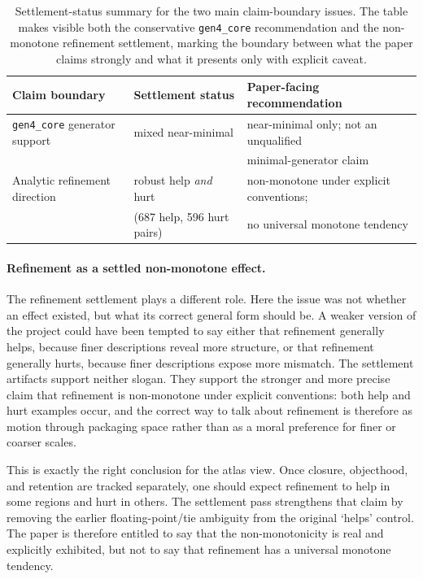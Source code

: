 \documentclass[11pt]{article}
\theoremstyle{definition}
\begin{document}
\begin{table}[t]
    \centering
    \caption{Settlement-status summary for the two main claim-boundary issues. The table makes visible both the conservative \texttt{gen4\_core} recommendation and the non-monotone refinement settlement, marking the boundary between what the paper claims strongly and what it presents only with explicit caveat.}
    \label{fig:settlement_matrix}
    \smallskip
    {\small
    \setlength{\tabcolsep}{5pt}
    \begin{tabular}{@{}lll@{}}
    \toprule
    \textbf{Claim boundary} & \textbf{Settlement status} & \textbf{Paper-facing recommendation} \\
    \midrule
    \texttt{gen4\_core} generator support
      & mixed near-minimal
      & near-minimal only; not an unqualified \\
      & & minimal-generator claim \\
    \addlinespace[3pt]
    Analytic refinement direction
      & robust help \emph{and} hurt
      & non-monotone under explicit conventions; \\
      & (687 help, 596 hurt pairs)
      & no universal monotone tendency \\
    \bottomrule
    \end{tabular}
    }
\end{table}

\paragraph{Refinement as a settled non-monotone effect.}
The refinement settlement plays a different role. Here the issue was not whether an effect existed, but what its correct general form should be. A weaker version of the project could have been tempted to say either that refinement generally helps, because finer descriptions reveal more structure, or that refinement generally hurts, because finer descriptions expose more mismatch. The settlement artifacts support neither slogan. They support the stronger and more precise claim that refinement is non-monotone under explicit conventions: both help and hurt examples occur, and the correct way to talk about refinement is therefore as motion through packaging space rather than as a moral preference for finer or coarser scales.

This is exactly the right conclusion for the atlas view. Once closure, objecthood, and retention are tracked separately, one should expect refinement to help in some regions and hurt in others. The settlement pass strengthens that claim by removing the earlier floating-point/tie ambiguity from the original `helps' control. The paper is therefore entitled to say that the non-monotonicity is real and explicitly exhibited, but not to say that refinement has a universal monotone tendency.
\end{document}
